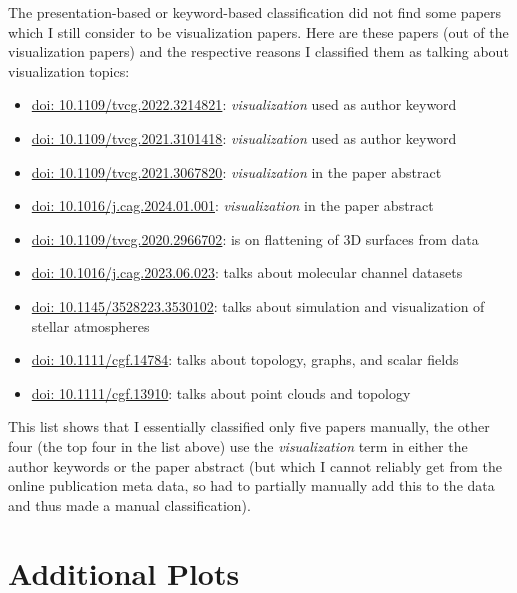 \documentclass[conference,svgnames]{vgtc}                     %
\begin{document}
The presentation-based or keyword-based classification did not find some papers which I still consider to be visualization papers. Here are these \GrsiVisManuallyMarkedPapersCount{} papers (out of the \GrsiTotalVisPapers{} visualization papers) and the respective reasons I classified them as talking about visualization topics:
\begin{itemize}
\item \href{https://doi.org/10.1109/tvcg.2022.3214821}{doi: 10.1109/tvcg.2022.3214821}: \emph{visualization} used as author keyword
\item \href{https://doi.org/10.1109/tvcg.2021.3101418}{doi: 10.1109/tvcg.2021.3101418}: \emph{visualization} used as author keyword
\item \href{https://doi.org/10.1109/tvcg.2021.3067820}{doi: 10.1109/tvcg.2021.3067820}: \emph{visualization} in the paper abstract
\item \href{https://doi.org/10.1016/j.cag.2024.01.001}{doi: 10.1016/j.cag.2024.01.001}: \emph{visualization} in the paper abstract
\item \href{https://doi.org/10.1109/tvcg.2020.2966702}{doi: 10.1109/tvcg.2020.2966702}: is on flattening of 3D surfaces from data
\item \href{https://doi.org/10.1016/j.cag.2023.06.023}{doi: 10.1016/j.cag.2023.06.023}: talks about molecular channel datasets
\item \href{https://doi.org/10.1145/3528223.3530102}{doi: 10.1145/3528223.3530102}: talks about simulation and visualization of stellar atmospheres
\item \href{https://doi.org/10.1111/cgf.14784}{doi: 10.1111/cgf.14784}: talks about topology, graphs, and scalar fields
\item \href{https://doi.org/10.1111/cgf.13910}{doi: 10.1111/cgf.13910}: talks about point clouds and topology
\end{itemize}
This list shows that I essentially classified only five papers manually, the other four (the top four in the list above) use the \emph{visualization} term in either the author keywords or the paper abstract (but which I cannot reliably get from the online publication meta data, so had to partially manually add this to the data and thus made a manual classification).

\section{Additional Plots}
\label{app:plots}
\end{document}
